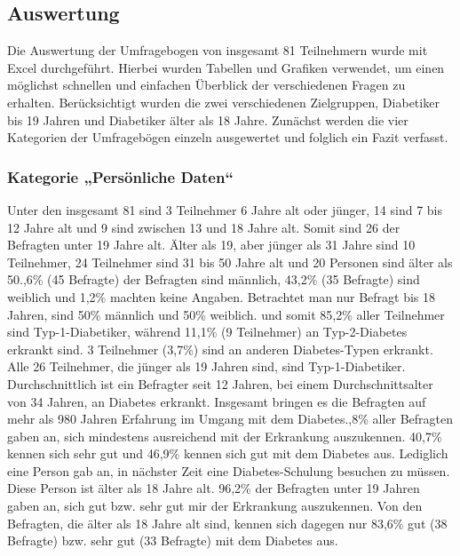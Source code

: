 \documentclass[a4paper,11pt]{article}%
\renewcommand{\\}{\vspace*{0.5\baselineskip} \newline}
\begin{document}
	\subsection{Auswertung}
	Die Auswertung der Umfragebogen von insgesamt 81 Teilnehmern wurde mit Excel durchgeführt. Hierbei wurden Tabellen und Grafiken verwendet, um einen möglichst schnellen und einfachen Überblick der verschiedenen Fragen zu erhalten. Berücksichtigt wurden die zwei verschiedenen Zielgruppen, Diabetiker bis 19 Jahren und Diabetiker älter als 18 Jahre.
	Zunächst werden die vier Kategorien der Umfragebögen einzeln ausgewertet und folglich ein Fazit verfasst.
	\subsubsection{Kategorie „Persönliche Daten“}
	Unter den insgesamt 81 sind 3 Teilnehmer 6 Jahre alt oder jünger, 14 sind 7 bis 12 Jahre alt und 9 sind zwischen 13 und 18 Jahre alt. Somit sind 26 der Befragten unter 19 Jahre alt. Älter als 19, aber jünger als 31 Jahre sind 10 Teilnehmer, 24 Teilnehmer sind 31 bis 50 Jahre alt und 20 Personen sind älter als 50.,6\% (45 Befragte) der Befragten sind männlich, 43,2\% (35 Befragte) sind weiblich und 1,2\% machten keine Angaben. Betrachtet man nur Befragt bis 18 Jahren, sind 50\% männlich und 50\% weiblich. und somit 85,2\% aller Teilnehmer sind Typ-1-Diabetiker, während 11,1\% (9 Teilnehmer) an Typ-2-Diabetes erkrankt sind. 3 Teilnehmer (3,7\%) sind an anderen Diabetes-Typen erkrankt. Alle 26 Teilnehmer, die jünger als 19 Jahren sind, sind Typ-1-Diabetiker.\newline
	Durchschnittlich ist ein Befragter seit 12 Jahren, bei einem Durchschnittsalter von 34 Jahren, an Diabetes erkrankt. Insgesamt bringen es die Befragten auf mehr als 980 Jahren Erfahrung im Umgang mit dem Diabetes.,8\% aller Befragten gaben an, sich mindestens ausreichend mit der Erkrankung auszukennen. 40,7\% kennen sich sehr gut und 46,9\% kennen sich gut mit dem Diabetes aus. Lediglich eine Person gab an, in nächster Zeit eine Diabetes-Schulung besuchen zu müssen.\newline
	Diese Person ist älter als 18 Jahre alt. 96,2\% der Befragten unter 19 Jahren gaben an, sich gut bzw. sehr gut mir der Erkrankung auszukennen. Von den Befragten, die älter als 18 Jahre alt sind, kennen sich dagegen nur 83,6\% gut (38 Befragte) bzw. sehr gut (33 Befragte) mit dem Diabetes aus.\newline
\end{document}
